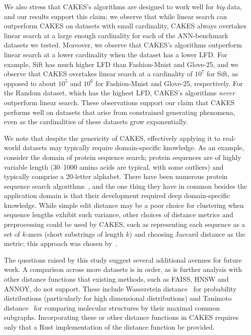 We also stress that CAKES's algorithms are designed to work well for \textit{big} data, and our results support this claim;
we observe that while linear search can outperform CAKES on datasets with small cardinality, CAKES always overtakes linear search at a large enough cardinality for each of the ANN-benchmark datasets we tested.
Moreover, we observe that CAKES's algorithms outperform linear search at a lower cardinality when the dataset has a lower LFD.
For example, Sift has much higher LFD than Fashion-Mnist and Glove-25, and we observe that CAKES overtakes linear search at a cardinality of $10^7$ for Sift, as opposed to about $10^5$ and $10^6$ for Fashion-Mnist and Glove-25, respectively.
For the Random dataset, which has the highest LFD, CAKES's algorithms \textit{never} outperform linear search.
These observations support our claim that CAKES performs well on datasets that arise from constrained generating phenomena, even as the cardinalities of these datasets grow exponentially.

We note that despite the genericity of CAKES, effectively applying it to real-world datasets may typically require domain-specific knowledge.
As an example, consider the domain of protein sequence search; protein sequences are of highly variable length (30--1000 amino acids are typical, with some outliers) and typically comprise a 20-letter alphabet.
There have been numerous protein sequence search algorithms~\cite{kim2021entrance, daniels2013compressive, yu2015entropy, steinegger2018clustering}, and the one thing they have in common besides the application domain is that their development required deep domain-specific knowledge.
While simple edit distance may be a poor choice for clustering when sequence lengths exhibit such variance, other choices of distance metrics and preprocessing could be used by CAKES, such as representing each sequence as a set of $k$-mers (short substrings of length $k$) and choosing Jaccard distance as the metric; this approach was chosen by~\cite{kim2021entrance}.

The questions raised by this study suggest several additional avenues for future work.
A comparison across more datasets is in order, as is further analysis with other distance functions that existing methods, such as FAISS, HNSW and ANNOY, do not support.
These include Wasserstein distance~\cite{vallender1974calculation} for probability distributions (particularly for high dimensional distributions) and Tanimoto distance~\cite{bajusz2015tanimoto} for comparing molecular structures by their maximal common subgraphs.
Incorporating these or other distance functions in CAKES requires only that a Rust implementation of the distance function be provided.

